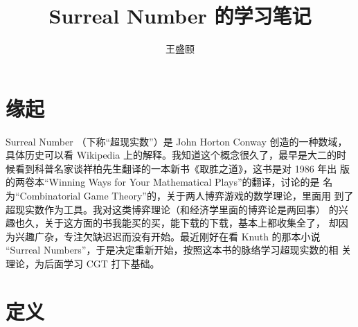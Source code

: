 \documentclass[cs4size,a4paper,adobefonts]{ctexart}
\begin{document}
\title{\bfseries Surreal Number 的学习笔记}
\author{王盛颐}
\date{}
\maketitle
\section{缘起}

Surreal Number （下称“超现实数”）是 John Horton Conway 创造的一种数域，
具体历史可以看 Wikipedia 上的解释。我知道这个概念很久了，最早是大二的时
候看到科普名家谈祥柏先生翻译的一本新书《取胜之道》，这书是对 1986 年出
版的两卷本``Winning Ways for Your Mathematical Plays''的翻译，讨论的是
名为``Combinatorial Game Theory''的，关于两人博弈游戏的数学理论，里面用
到了超现实数作为工具。我对这类博弈理论（和经济学里面的博弈论是两回事）
的兴趣也久，关于这方面的书我能买的买，能下载的下载，基本上都收集全了，
却因为兴趣广杂，专注欠缺迟迟而没有开始。最近刚好在看 Knuth 的那本小说
``Surreal Numbers''，于是决定重新开始，按照这本书的脉络学习超现实数的相
关理论，为后面学习 CGT 打下基础。

\section{定义}
\end{document}
